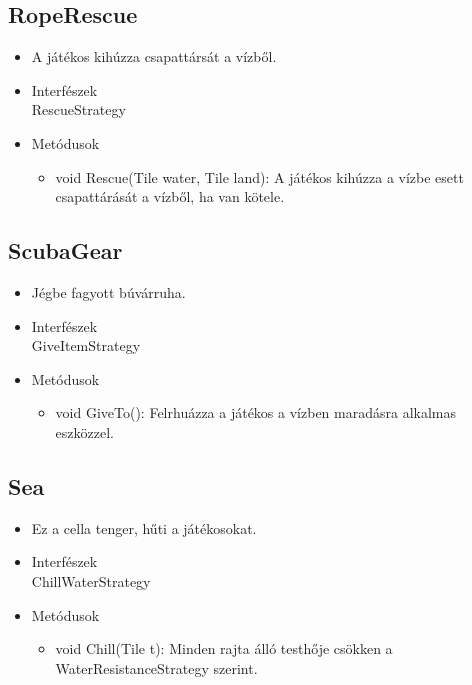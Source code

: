 \subsection{RopeRescue}
\begin{itemize}
	\item A játékos kihúzza csapattársát a vízből.\\
\item Interfészek\\
RescueStrategy

\item Metódusok
\begin{itemize}
	\item void Rescue(Tile water, Tile land): A játékos kihúzza a vízbe esett csapattárását a vízből, ha van kötele.
\end{itemize}
\end{itemize}

\subsection{ScubaGear}
\begin{itemize}
	\item Jégbe fagyott búvárruha.\\
\item Interfészek\\
GiveItemStrategy
\item Metódusok\\
\begin{itemize}
	\item void GiveTo(): Felrhuázza a játékos a vízben maradásra alkalmas eszközzel.
\end{itemize}
\end{itemize}

\subsection{Sea}
\begin{itemize}
	\item Ez a cella tenger, hűti a játékosokat.\\
\item Interfészek\\
ChillWaterStrategy

\item Metódusok
\begin{itemize}
	\item void Chill(Tile t): Minden rajta álló testhője csökken a WaterResistanceStrategy szerint.
\end{itemize}
\end{itemize}

